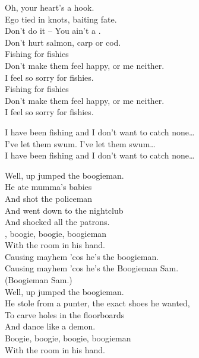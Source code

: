 
Oh, your heart's a hook. \\
Ego tied in knots, baiting fate. \\
Don't do it -- You ain't a . \\
Don't hurt salmon, carp or cod. \\

Fishing for fishies \\
Don't make them feel happy, or me neither. \\
I feel so sorry for fishies. \\
Fishing for fishies \\
Don't make them feel happy, or me neither. \\
I feel so sorry for fishies. \\


I have been fishing and I don't want to catch none… \\

I've let them swum. I've let them swum… \\

I have been fishing and I don't want to catch none… \\





Well, up jumped the boogieman. \\
He ate mumma's babies \\
And shot the policeman \\
And went down to the nightclub \\
And shocked all the patrons. \\
, boogie, boogie, boogieman \\
With the room in his hand. \\

Causing mayhem 'cos he's the boogieman. \\
Causing mayhem 'cos he's the Boogieman Sam. \\
(Boogieman Sam.) \\

Well, up jumped the boogieman. \\
He stole from a punter, the exact shoes he wanted, \\
To carve holes in the floorboards \\
And dance like a demon. \\
Boogie, boogie, boogie, boogieman \\
With the room in his hand. \\

